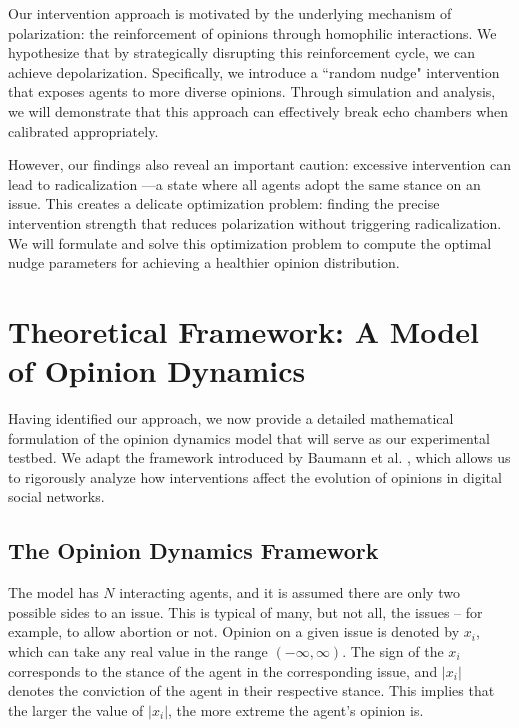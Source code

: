 Our intervention approach is motivated by the underlying mechanism of polarization: the reinforcement of opinions through homophilic interactions. We hypothesize that by strategically disrupting this reinforcement cycle, we can achieve depolarization. Specifically, we introduce a ``random nudge" intervention that exposes agents to more diverse opinions. Through simulation and analysis, we will demonstrate that this approach can effectively break echo chambers when calibrated appropriately.

However, our findings also reveal an important caution: excessive intervention can lead to radicalization \cite{the-group-polarization-phemomenon, group-polarization-a-critical-review-and-meta-analysis}—a state where all agents adopt the same stance on an issue. This creates a delicate optimization problem: finding the precise intervention strength that reduces polarization without triggering radicalization. We will formulate and solve this optimization problem to compute the optimal nudge parameters for achieving a healthier opinion distribution.
\section{Theoretical Framework: A Model of Opinion Dynamics}
Having identified our approach, we now provide a detailed mathematical formulation of the opinion dynamics model that will serve as our experimental testbed. We adapt the framework introduced by Baumann et al. \cite{modeling-echo-chambers-and-polarizaiton-dynamics-in-social-networks}, which allows us to rigorously analyze how interventions affect the evolution of opinions in digital social networks.
\subsection{The Opinion Dynamics Framework}
The model has $N$ interacting agents, and it is assumed there are only two possible sides to an issue. This is typical of many, but not all, the issues -- for example, to allow abortion or not. Opinion on a given issue is denoted by $x_i$, which can take any real value in the range $(-\infty, \infty)$. The sign of the $x_i$ corresponds to the stance of the agent in the corresponding issue, and $|x_i|$ denotes the conviction of the agent in their respective stance. This implies that the larger the value of $|x_i|$, the more extreme the agent's opinion is. 

